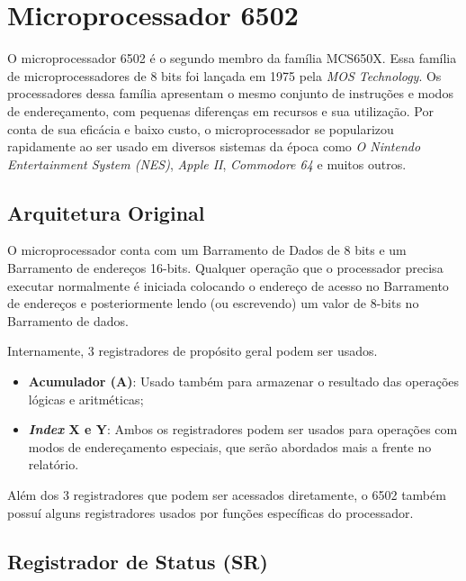 \documentclass[
	12pt,				  %
	openright,		%
	a4paper,			%
	english,			%
	french,				%
	spanish,			%
	brazil,				%
]{abntex2}
\begin{document}
\section{Microprocessador 6502}

O microprocessador 6502 é o segundo membro da família MCS650X. Essa família de
microprocessadores de 8 bits foi lançada em 1975 pela \emph{MOS Technology}.
Os processadores dessa família apresentam o mesmo conjunto de instruções e modos
de endereçamento, com pequenas diferenças em recursos e sua utilização. Por
conta de sua eficácia e baixo custo, o microprocessador se popularizou
rapidamente ao ser usado em diversos sistemas da época como \emph{O Nintendo
	Entertainment System (NES)}, \emph{Apple II}, \emph{Commodore 64} e muitos
outros.
\subsection{Arquitetura Original}
O microprocessador conta com um Barramento de Dados de 8 bits e um Barramento de
endereços 16-bits. Qualquer operação que o processador precisa executar
normalmente é iniciada colocando o endereço de acesso no Barramento de endereços
e posteriormente lendo (ou escrevendo) um valor de 8-bits no Barramento de dados.

Internamente, 3 registradores de propósito geral podem ser usados.
\begin{itemize}
	\item \textbf{Acumulador (A)}: Usado também para armazenar o resultado das
	      operações lógicas e aritméticas;
	\item \textbf{\emph{Index} X e Y}: Ambos os registradores podem ser usados
	      para operações com modos de endereçamento especiais, que serão abordados
	      mais a frente no relatório.
\end{itemize}

Além dos 3 registradores que podem ser acessados diretamente, o 6502 também
possuí alguns registradores usados por funções específicas do processador.

\subsection{Registrador de Status (SR)} \label{statusReg}
\end{document}
